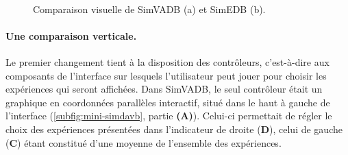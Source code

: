 \begin{figure}[H]
	\centering
	\\[-1.5ex]
	\hspace{1pt}
	\vspace{-0.3cm}
	\caption{Comparaison visuelle de SimVADB (a) et SimEDB (b).}
	\label{fig:comparaison-simvadb-simedb}
\end{figure}


\paragraph{Une comparaison verticale.}

Le premier changement tient à la disposition des \og contrôleurs\fg{}, c'est-à-dire aux composants de l'interface sur lesquels l'utilisateur peut jouer pour choisir les expériences qui seront affichées.
Dans SimVADB, le seul contrôleur était un graphique en coordonnées parallèles interactif, situé dans le haut à gauche de l'interface (\cref{subfig:mini-simdavb}, partie \textbf{(A)}).
Celui-ci permettait de régler le choix des expériences présentées dans l'indicateur de droite (\textbf{D}), celui de gauche (\textbf{C}) étant constitué d'une moyenne de l'ensemble des expériences.

